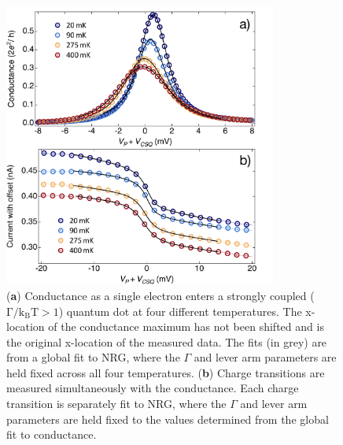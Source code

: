 \begin{figure}[!bht]
 \begin{center}
 \includegraphics[width=0.8\textwidth]{figures/ch3/figure13.pdf}
 \caption[Fit Conductance and Charge Transition to NRG]{\label{fig:ch3/cond_ct_gf} 
 (\textbf{a}) Conductance as a single electron enters a strongly coupled ($\mathrm{\Gamma/k_BT > 1}$) quantum dot at four different temperatures. The x-location of the conductance maximum has not been shifted and is the original x-location of the measured data. The fits (in grey) are from a global fit to NRG, where the $\Gamma$ and lever arm parameters are held fixed across all four temperatures. (\textbf{b}) Charge transitions are measured simultaneously with the conductance. Each charge transition is separately fit to NRG, where the $\Gamma$ and lever arm parameters are held fixed to the values determined from the global fit to conductance.}
 \end{center}
\end{figure}

